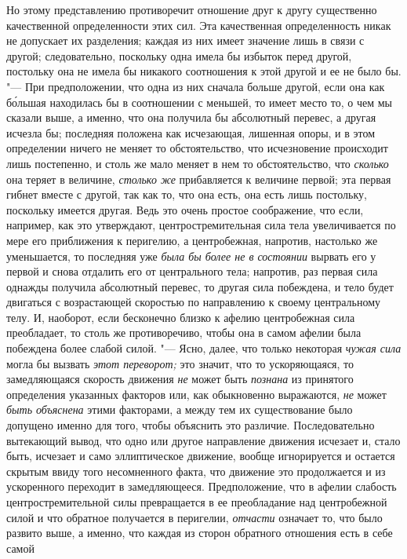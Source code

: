 Но этому представлению противоречит отношение друг к другу существенно
качественной определенности этих сил. Эта качественная определенность никак
не допускает их разделения; каждая из них имеет значение лишь в связи с
другой; следовательно, поскольку одна имела бы избыток перед другой,
постольку она не имела бы никакого соотношения к этой другой и ее не было
бы. "--- При предположении, что одна из них сначала больше другой, если она
как б\'{о}льшая находилась бы в соотношении с меньшей, то имеет место то, о чем
мы сказали выше, а именно, что она получила бы абсолютный перевес, а другая
исчезла бы; последняя положена как исчезающая, лишенная опоры, и в этом
определении ничего не меняет то обстоятельство, что исчезновение происходит
лишь постепенно, и столь же мало меняет в нем то обстоятельство, что
{\em сколько} она теряет в величине,
{\em столько же} прибавляется к величине первой; эта
первая гибнет вместе с другой, так как то, что она есть, она есть лишь
постольку, поскольку имеется другая. Ведь это очень простое соображение,
что если, например, как это утверждают, центростремительная сила тела
увеличивается по мере его приближения к перигелию, а центробежная,
напротив, настолько же уменьшается, то последняя уже
{\em была бы более не в состоянии} вырвать его у первой
и снова отдалить его от центрального тела; напротив, раз первая сила
однажды получила абсолютный перевес, то другая сила побеждена, и тело будет
двигаться с возрастающей скоростью по направлению к своему центральному
телу. И, наоборот, если бесконечно близко к афелию центробежная сила
преобладает, то столь же противоречиво, чтобы она в самом афелии была
побеждена более слабой силой. "--- Ясно, далее, что только некоторая
{\em чужая сила} могла бы вызвать
{\em этот переворот;} это значит, что то ускоряющаяся,
то замедляющаяся скорость движения {\em не} может быть
{\em познана} из принятого определения указанных
факторов или, как обыкновенно выражаются, {\em не}
может {\em быть объяснена} этими факторами, а между тем
их существование было допущено именно для того, чтобы объяснить это
различие. Последовательно вытекающий вывод, что одно или другое направление
движения исчезает и, стало быть, исчезает и само эллиптическое движение,
вообще игнорируется и остается скрытым ввиду того несомненного факта, что
движение это продолжается и из ускоренного переходит в замедляющееся.
Предположение, что в афелии слабость центростремительной силы превращается
в ее преобладание над центробежной силой и что обратное получается в
перигелии, {\em отчасти} означает то, что было развито
выше, а именно, что каждая из сторон обратного отношения есть в себе самой

